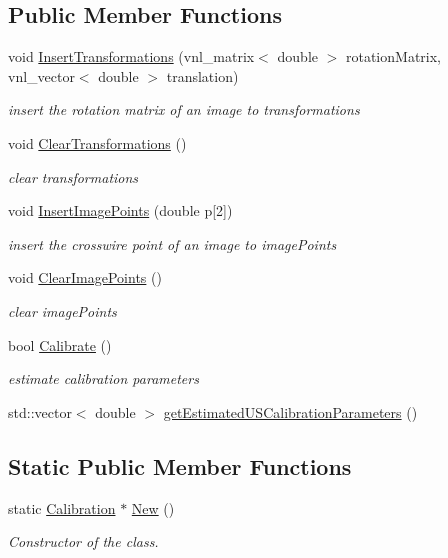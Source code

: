 \subsection*{Public Member Functions}
\begin{DoxyCompactItemize}
\item 
void \hyperlink{class_calibration_ab2b775f18ffbea5e79d4175a2e44f22d}{Insert\-Transformations} (vnl\-\_\-matrix$<$ double $>$ rotation\-Matrix, vnl\-\_\-vector$<$ double $>$ translation)
\begin{DoxyCompactList}\small\item\em insert the rotation matrix of an image to transformations \end{DoxyCompactList}\item 
void \hyperlink{class_calibration_adcd2af289aafc20b7dfd3adf3aa066e4}{Clear\-Transformations} ()
\begin{DoxyCompactList}\small\item\em clear transformations \end{DoxyCompactList}\item 
void \hyperlink{class_calibration_a8960012f68fb9f0eae6038549274a941}{Insert\-Image\-Points} (double p\mbox{[}2\mbox{]})
\begin{DoxyCompactList}\small\item\em insert the crosswire point of an image to image\-Points \end{DoxyCompactList}\item 
void \hyperlink{class_calibration_a87978d8b81b28411e6e1bd8f8db32bb8}{Clear\-Image\-Points} ()
\begin{DoxyCompactList}\small\item\em clear image\-Points \end{DoxyCompactList}\item 
bool \hyperlink{class_calibration_af75144d0e8bbd275a46882189d67b172}{Calibrate} ()
\begin{DoxyCompactList}\small\item\em estimate calibration parameters \end{DoxyCompactList}\item 
std\-::vector$<$ double $>$ \hyperlink{class_calibration_a732ad8da48b5287c29482618f9cbf5fa}{get\-Estimated\-U\-S\-Calibration\-Parameters} ()
\end{DoxyCompactItemize}
\subsection*{Static Public Member Functions}
\begin{DoxyCompactItemize}
\item 
static \hyperlink{class_calibration}{Calibration} $\ast$ \hyperlink{class_calibration_a31abdaca0f949a20e9563f8d3f16289f}{New} ()
\begin{DoxyCompactList}\small\item\em Constructor of the class. \end{DoxyCompactList}\end{DoxyCompactItemize}
